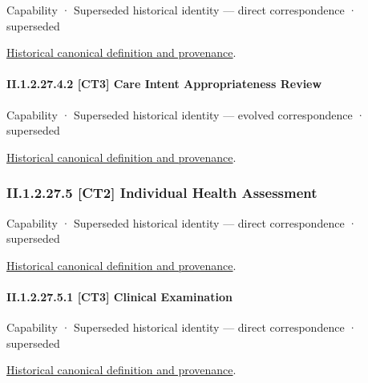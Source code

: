 \label{element:31f49cdea9f44f188459503580c2b86e}
{\small Capability · Superseded historical identity — direct correspondence · superseded}\par
\href{../../../../continuum/strategy/capability/31f49cdea9f44f188459503580c2b86e.md}{Historical canonical definition and provenance}.\par
\paragraph*{II.1.2.27.4.2 [CT3] Care Intent Appropriateness Review}
\label{navigation:II.1.2.27.4.2}

\label{element:905eb2de1ac341ac96331e3d7f76079b}
{\small Capability · Superseded historical identity — evolved correspondence · superseded}\par
\href{../../../../continuum/strategy/capability/905eb2de1ac341ac96331e3d7f76079b.md}{Historical canonical definition and provenance}.\par
\subsubsection*{II.1.2.27.5 [CT2] Individual Health Assessment}
\label{navigation:II.1.2.27.5}

\label{element:9111446aa2d045bd9acd98542b0eef1f}
{\small Capability · Superseded historical identity — direct correspondence · superseded}\par
\href{../../../../continuum/strategy/capability/9111446aa2d045bd9acd98542b0eef1f.md}{Historical canonical definition and provenance}.\par
\paragraph*{II.1.2.27.5.1 [CT3] Clinical Examination}
\label{navigation:II.1.2.27.5.1}

\label{element:8bc15e2b8f114deebcbbe3f2013a8147}
{\small Capability · Superseded historical identity — direct correspondence · superseded}\par
\href{../../../../continuum/strategy/capability/8bc15e2b8f114deebcbbe3f2013a8147.md}{Historical canonical definition and provenance}.\par
